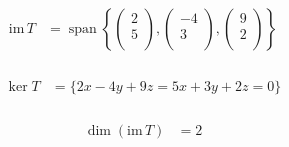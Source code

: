 \documentclass[fleqn, a4paper]{amsart}
\DeclareMathOperator{\vspan}{\mathrm{span}} %
\theoremstyle{definition}
\theoremstyle{theorem}
\theoremstyle{remark}
\newcommand{\im}{\mathrm{im}\,}
\numberwithin{corollary}{theorem}
\numberwithin{equation}{theorem}
\begin{document}
\begin{multicols}{1}
\subsubsection{}

\begin{align*}
	\im T &= \vspan
		\left\lbrace
			\begin{pmatrix}
				2\\
				5\\
			\end{pmatrix}
			,
			\begin{pmatrix}
				-4\\
				3\\
			\end{pmatrix}
			,
			\begin{pmatrix}
			9\\
			2\\
			\end{pmatrix}
		\right\rbrace
\end{align*}

\subsubsection{}

\begin{align*}
	\ker T &= \{2x - 4y + 9z = 5x + 3y + 2z = 0\}
\end{align*}

\subsubsection{}

\begin{align*}
	\dim (\im T) &= 2
\end{align*}

\subsection{}


\end{multicols}
\end{document}
